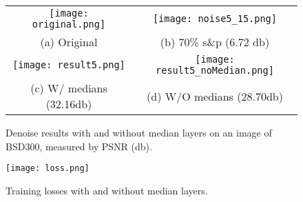 \documentclass[journal]{IEEEtran}
\begin{document}
\begin{figure}
  \centering
  \setlength\tabcolsep{0.05pt}
  \begin{tabular}{cc}
  \texttt{[image: original.png]} &
  \texttt{[image: noise5\_15.png]} \\
  \small (a) Original &\small  (b) 70\% s\&p (6.72 db) \\
  \texttt{[image: result5.png]} &
  \texttt{[image: result5\_noMedian.png]}\\
  \small (c) W/ medians (32.16db) &\small  (d) W/O medians (28.70db) \\
  \end{tabular}
  \caption{Denoise results with and without median layers on an image of BSD300, measured by PSNR (db).
    }\label{fig:WOmedians}
\end{figure}

\begin{figure}
  \centering
  \texttt{[image: loss.png]}
  \caption{Training losses with and without median layers.
    }\label{fig:median_loss}
\end{figure}
\end{document}
